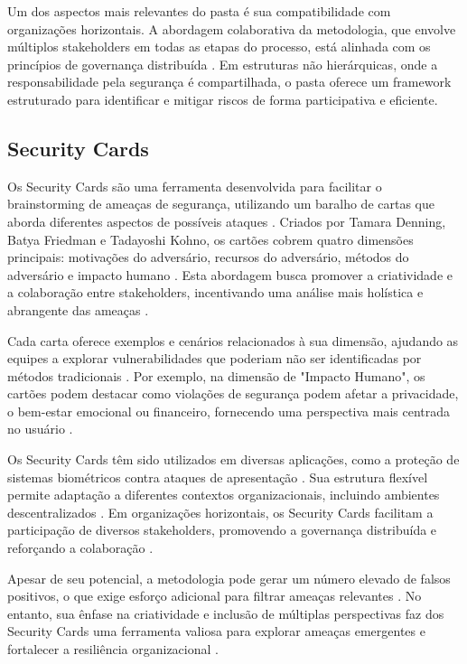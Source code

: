 Um dos aspectos mais relevantes do \gls{pasta} é sua compatibilidade com
organizações horizontais. A abordagem colaborativa da metodologia, que
envolve múltiplos stakeholders em todas as etapas do processo, está
alinhada com os princípios de governança distribuída \cite{Colbac}.
Em estruturas não hierárquicas, onde a responsabilidade pela segurança é
compartilhada, o \gls{pasta} oferece um framework estruturado para
identificar e mitigar riscos de forma participativa e eficiente.

\subsection{Security Cards}
\label{subsec:security_cards}

Os Security Cards são uma ferramenta desenvolvida para facilitar o
brainstorming de ameaças de segurança, utilizando um baralho de cartas
que aborda diferentes aspectos de possíveis ataques
\cite{SecurityCardsToolkit}. Criados por Tamara Denning, Batya
Friedman e Tadayoshi Kohno, os cartões cobrem quatro dimensões
principais: motivações do adversário, recursos do adversário, métodos
do adversário e impacto humano \cite{KeepingAheadofOurAdversaries}.
Esta abordagem busca promover a criatividade e a colaboração entre
stakeholders, incentivando uma análise mais holística e abrangente das
ameaças \cite{CyberThreatModeling}.

Cada carta oferece exemplos e cenários relacionados à sua dimensão,
ajudando as equipes a explorar vulnerabilidades que poderiam não ser
identificadas por métodos tradicionais \cite{SecurityCardsToolkit}.
Por exemplo, na dimensão de "Impacto Humano", os cartões podem
destacar como violações de segurança podem afetar a privacidade, o
bem-estar emocional ou financeiro, fornecendo uma perspectiva mais
centrada no usuário \cite{KeepingAheadofOurAdversaries}.

Os Security Cards têm sido utilizados em diversas aplicações, como a
proteção de sistemas biométricos contra ataques de apresentação
\cite{AttackTreesforProtectingBiometric, KeepingAheadofOurAdversaries}.
Sua estrutura flexível permite adaptação a diferentes contextos organizacionais, incluindo
ambientes descentralizados \cite{ParticipatoryThreatModelling}.
Em organizações horizontais, os Security Cards facilitam
a participação de diversos stakeholders, promovendo a
governança distribuída e reforçando a colaboração
\cite{CyberThreatModeling}.

Apesar de seu potencial, a metodologia pode gerar um número elevado de
falsos positivos, o que exige esforço adicional para filtrar ameaças
relevantes \cite{KeepingAheadofOurAdversaries}. No entanto, sua ênfase
na criatividade e inclusão de múltiplas perspectivas faz dos Security
Cards uma ferramenta valiosa para explorar ameaças emergentes e
fortalecer a resiliência organizacional \cite{CyberThreatModeling}.

